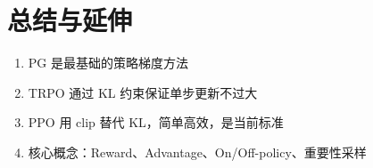 \section{总结与延伸}
\begin{enumerate}
  \item PG 是最基础的策略梯度方法
  \item TRPO 通过 KL 约束保证单步更新不过大
  \item PPO 用 clip 替代 KL，简单高效，是当前标准
  \item 核心概念：Reward、Advantage、On/Off-policy、重要性采样
\end{enumerate}

